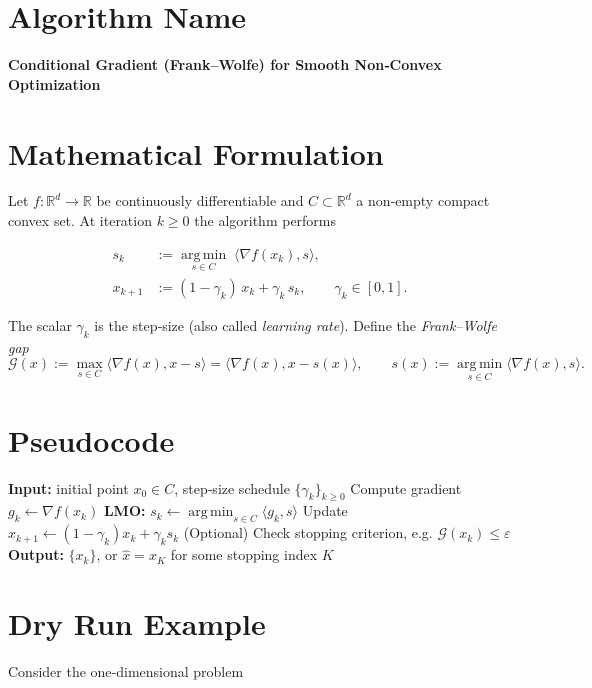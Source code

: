 \documentclass{article}
\newcommand{\grad}{\nabla}
\newcommand{\inner}[2]{\langle #1,#2\rangle}
\newcommand{\argmin}{\operatorname*{arg\,min}}
\newcommand{\R}{\mathbb{R}}
\begin{document}
\section*{Algorithm Name}
\textbf{Conditional Gradient (Frank–Wolfe) for Smooth Non‑Convex Optimization}

\section*{Mathematical Formulation}
Let $f:\R^{d}\rightarrow\R$ be continuously differentiable and $C\subset\R^{d}$ a non‑empty compact convex set.  
At iteration $k\ge 0$ the algorithm performs

\begin{align}
s_{k} &:= \argmin_{s\in C}\;\inner{\grad f(x_{k})}{s}, \label{eq:lmo}\\
x_{k+1} &:= (1-\gamma_{k})\,x_{k} + \gamma_{k}\,s_{k}, \qquad \gamma_{k}\in[0,1]. \label{eq:update}
\end{align}

The scalar $\gamma_{k}$ is the step‑size (also called \emph{learning rate}).  
Define the \emph{Frank–Wolfe gap}
\[
\mathcal{G}(x):=\max_{s\in C}\inner{\grad f(x)}{x-s}
               =\inner{\grad f(x)}{x-s(x)},
\qquad s(x):=\argmin_{s\in C}\inner{\grad f(x)}{s}.
\tag{FW‑gap}
\]

\section*{Pseudocode}
\begin{algorithm}[H]
\caption{Frank–Wolfe for Smooth Non‑Convex $f$}
\begin{algorithmic}[1]
\State \textbf{Input:} initial point $x_{0}\in C$, step‑size schedule $\{\gamma_{k}\}_{k\ge0}$
    \State Compute gradient $g_{k}\gets \grad f(x_{k})$
    \State \textbf{LMO: } $s_{k}\gets \argmin_{s\in C}\inner{g_{k}}{s}$ \label{alg:lmo}
    \State Update $x_{k+1}\gets (1-\gamma_{k})x_{k}+\gamma_{k}s_{k}$ \label{alg:update}
    \State (Optional) Check stopping criterion, e.g. $\mathcal{G}(x_{k})\le\varepsilon$
\EndFor
\State \textbf{Output:} $\{x_{k}\}$, or $\hat{x}=x_{K}$ for some stopping index $K$
\end{algorithmic}
\end{algorithm}

\section*{Dry Run Example}
Consider the one‑dimensional problem  
\end{document}
